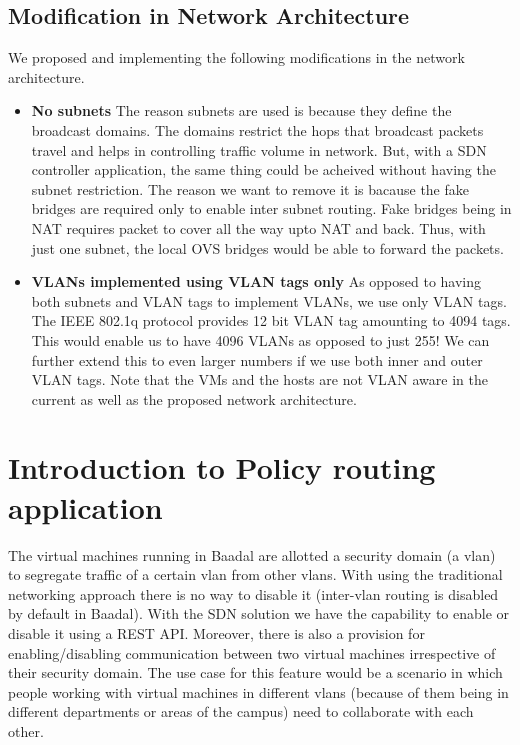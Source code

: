 \subsection{Modification in Network Architecture}
We proposed and implementing the following modifications in the network architecture.

\begin{itemize}
    \item \textbf{No subnets} The reason subnets are used is because they define the broadcast
domains. The domains restrict the hops that broadcast packets travel and
helps in controlling traffic volume in network. But, with a SDN controller
application, the same thing could be acheived without having the subnet
restriction. The reason we want to remove it is bacause the fake bridges
are required only to enable inter subnet routing. Fake bridges being in
NAT requires packet to cover all the way upto NAT and back. Thus,
with just one subnet, the local OVS bridges would be able to forward the
packets.
\item \textbf{VLANs implemented using VLAN tags only} As opposed to having both
subnets and VLAN tags to implement VLANs, we use only VLAN tags.
The IEEE 802.1q protocol provides 12 bit VLAN tag amounting to 4094
tags. This would enable us to have 4096 VLANs as opposed to just 255!
We can further extend this to even larger numbers if we use both inner
and outer VLAN tags. Note that the VMs and the hosts are not VLAN
aware in the current as well as the proposed network architecture.

\end{itemize}

\section{Introduction to Policy routing application}
The virtual machines running in Baadal are allotted a security domain (a vlan) to segregate traffic of a certain vlan from other vlans. With using the traditional networking approach there is no way to disable it (inter-vlan routing is disabled by default in Baadal). With the SDN solution we have the capability to enable or disable it using a REST API. Moreover, there is also a provision for enabling/disabling communication between two virtual machines irrespective of their security domain. The use case for this feature would be a scenario in which people working with virtual machines in different vlans (because of them being in different departments or areas of the campus) need to collaborate with each other.


